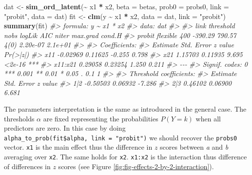 \documentclass[
  man, mask,floatsintext]{apa6}
\newenvironment{Shaded}{\begin{snugshade}}{\end{snugshade}}
\newcommand{\AttributeTok}[1]{\textcolor[rgb]{0.13,0.29,0.53}{#1}}
\newcommand{\CommentTok}[1]{\textcolor[rgb]{0.56,0.35,0.01}{\textit{#1}}}
\newcommand{\FunctionTok}[1]{\textcolor[rgb]{0.13,0.29,0.53}{\textbf{#1}}}
\newcommand{\NormalTok}[1]{#1}
\newcommand{\OtherTok}[1]{\textcolor[rgb]{0.56,0.35,0.01}{#1}}
\newcommand{\SpecialCharTok}[1]{\textcolor[rgb]{0.81,0.36,0.00}{\textbf{#1}}}
\newcommand{\StringTok}[1]{\textcolor[rgb]{0.31,0.60,0.02}{#1}}
\begin{document}
\begin{Shaded}
\begin{Highlighting}[]
\NormalTok{dat }\OtherTok{\textless{}{-}} \FunctionTok{sim\_ord\_latent}\NormalTok{(}\SpecialCharTok{\textasciitilde{}}\NormalTok{ x1 }\SpecialCharTok{*}\NormalTok{ x2, }\AttributeTok{beta =}\NormalTok{ betas, }\AttributeTok{prob0 =}\NormalTok{ probs0, }\AttributeTok{link =} \StringTok{"probit"}\NormalTok{, }\AttributeTok{data =}\NormalTok{ dat)}
\NormalTok{fit }\OtherTok{\textless{}{-}} \FunctionTok{clm}\NormalTok{(y }\SpecialCharTok{\textasciitilde{}}\NormalTok{ x1 }\SpecialCharTok{*}\NormalTok{ x2, }\AttributeTok{data =}\NormalTok{ dat, }\AttributeTok{link =} \StringTok{"probit"}\NormalTok{)}
\FunctionTok{summary}\NormalTok{(fit)}
\CommentTok{\#\textgreater{} formula: y \textasciitilde{} x1 * x2}
\CommentTok{\#\textgreater{} data:    dat}
\CommentTok{\#\textgreater{} }
\CommentTok{\#\textgreater{}  link   threshold nobs logLik  AIC    niter max.grad cond.H }
\CommentTok{\#\textgreater{}  probit flexible  400  {-}390.29 790.57 4(0)  2.20e{-}07 2.1e+01}
\CommentTok{\#\textgreater{} }
\CommentTok{\#\textgreater{} Coefficients:}
\CommentTok{\#\textgreater{}         Estimate Std. Error z value Pr(\textgreater{}|z|)    }
\CommentTok{\#\textgreater{} x11     {-}0.02969    0.11625  {-}0.255    0.798    }
\CommentTok{\#\textgreater{} x21      1.15703    0.11935   9.695   \textless{}2e{-}16 ***}
\CommentTok{\#\textgreater{} x11:x21  0.29058    0.23254   1.250    0.211    }
\CommentTok{\#\textgreater{} {-}{-}{-}}
\CommentTok{\#\textgreater{} Signif. codes:  0 \textquotesingle{}***\textquotesingle{} 0.001 \textquotesingle{}**\textquotesingle{} 0.01 \textquotesingle{}*\textquotesingle{} 0.05 \textquotesingle{}.\textquotesingle{} 0.1 \textquotesingle{} \textquotesingle{} 1}
\CommentTok{\#\textgreater{} }
\CommentTok{\#\textgreater{} Threshold coefficients:}
\CommentTok{\#\textgreater{}     Estimate Std. Error z value}
\CommentTok{\#\textgreater{} 1|2 {-}0.50503    0.06932  {-}7.286}
\CommentTok{\#\textgreater{} 2|3  0.46102    0.06900   6.681}
\end{Highlighting}
\end{Shaded}

\normalsize

The parameters interpretation is the same as introduced in the general case. The thresholds \(\alpha\) are fixed representing the probabilities \(P(Y = k)\) when all predictors are zero. In this case by doing \texttt{alpha\_to\_prob(fit\$alpha,\ link\ =\ "probit")} we should recover the \texttt{probs0} vector. \texttt{x1} is the main effect thus the difference in \(z\) scores between \emph{a} and \emph{b} averaging over \texttt{x2}. The same holds for \texttt{x2}. \texttt{x1:x2} is the interaction thus difference of differences in \(z\) scores (see Figure \ref{fig:fig-effects-2-by-2-interaction}).
\end{document}
